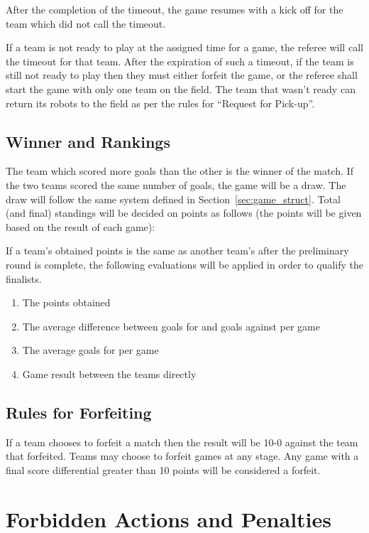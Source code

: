 \documentclass[12pt]{article}
\begin{document}
After the completion of the timeout, the game resumes with a kick
off for the team which did not call the timeout.

If a team is not ready to play at the assigned time for a game, the
referee will call the timeout for that team. After the expiration
of such a timeout, if the team is still not ready to play then they
must either forfeit the game, or the referee shall start the game with
only one team on the field.   The team that wasn't ready can return
its robots to the field as per the rules for ``Request for Pick-up''.

\subsection{Winner and Rankings}
The team which scored more goals than the other is the winner of the
match. If the two teams scored the same number of goals, the game
will be a draw. The draw will follow the same system defined in
Section~\ref{sec:game_struct}. Total (and final) standings will be
decided on points as follows (the points will be given based on the
result of each game):


If a team's obtained points is the same as another team's after the
preliminary round is complete, the following evaluations will be
applied in order to qualify the finalists.

\begin{enumerate}
\item The points obtained
\item The average difference between goals for and goals against per game
\item The average goals for per game
\item Game result between the teams directly
\end{enumerate}


\subsection{Rules for Forfeiting}

If a team chooses to forfeit a match then the result will be 10-0 against the
team that forfeited. Teams may choose to forfeit games at any stage. Any game
with a final score differential greater than 10 points will be considered a forfeit.

\section{Forbidden Actions and Penalties}
\label{sec:forbidden_act}
\end{document}
